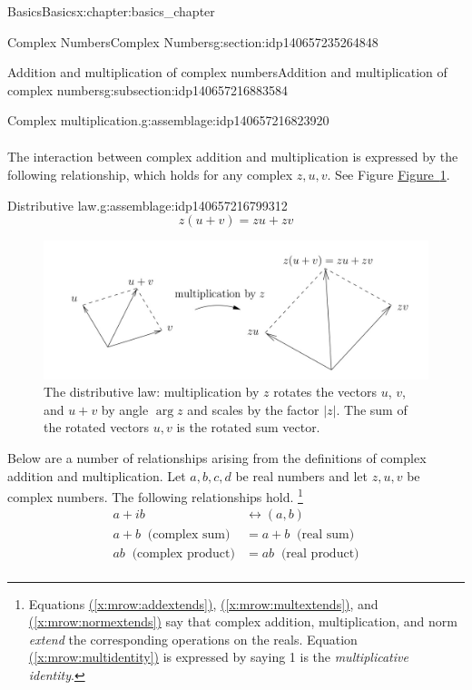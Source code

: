 \documentclass[oneside,10pt,]{book}
\numberwithin{equation}{section}
\newcommand{\amp}{&}
\begin{document}
\begin{chapterptx}{Basics}{}{Basics}{}{}{x:chapter:basics_chapter}
\begin{sectionptx}{Complex Numbers}{}{Complex Numbers}{}{}{g:section:idp140657235264848}
\begin{subsectionptx}{Addition and multiplication of complex numbers}{}{Addition and multiplication of complex numbers}{}{}{g:subsection:idp140657216883584}
\begin{assemblage}{Complex multiplication.}{g:assemblage:idp140657216823920}
\begin{align}
\end{align}
%
\end{assemblage}
The interaction between complex addition and multiplication is expressed by the following relationship, which holds for any complex \(z,u,v\). See Figure \hyperref[x:figure:distlawfig]{Figure~\ref{x:figure:distlawfig}}.%
\begin{assemblage}{Distributive law.}{g:assemblage:idp140657216799312}%
%
\begin{equation}
z(u+v) = zu+zv \label{x:men:distributivelaw}
\end{equation}
%
\end{assemblage}
\begin{figure}
\centering
\includegraphics[width=1\linewidth]{images/distlaw_clip.jpg}
\caption{The distributive law: multiplication by \(z\) rotates the vectors \(u\), \(v\), and \(u+v\) by angle \(\arg z\) and scales by the factor \(|z|\). The sum of the rotated vectors \(u,v\) is the rotated sum vector.\label{x:figure:distlawfig}}
\end{figure}
Below are a number of relationships arising from the definitions of complex addition and multiplication. Let \(a,b,c,d\) be real numbers and let \(z,u,v\) be complex numbers. The following relationships hold. \footnote{Equations \hyperref[x:mrow:addextends]{(\ref{x:mrow:addextends})}, \hyperref[x:mrow:multextends]{(\ref{x:mrow:multextends})}, and \hyperref[x:mrow:normextends]{(\ref{x:mrow:normextends})} say that complex addition, multiplication, and norm \emph{extend} the corresponding operations on the reals. Equation \hyperref[x:mrow:multidentity]{(\ref{x:mrow:multidentity})} is expressed by saying 1 is the \emph{multiplicative identity}.\label{g:fn:idp140657216817728}}%
\begin{align}
a+ib \amp \leftrightarrow (a,b)\label{g:mrow:idp140657216854976}\\
a+b \;\;\text{(complex sum)} \amp= a+b \;\;\text{(real sum)}\label{x:mrow:addextends}\\
ab \;\;\text{(complex product)} \amp = ab \;\;\text{(real product)}\label{x:mrow:multextends}\\

\end{align}
\end{subsectionptx}
\end{sectionptx}
\end{chapterptx}
\end{document}

